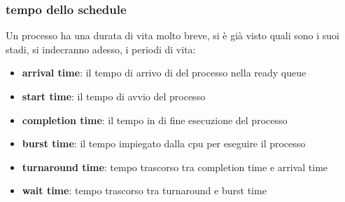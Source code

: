 \documentclass{article}
\begin{document}
        \subsubsection{tempo dello schedule}
            Un processo ha una durata di vita molto breve, si è già visto quali sono i suoi stadi, si indecranno adesso, i periodi di vita:
            \begin{itemize}
                \item \textbf{arrival time}:
                    il tempo di arrivo di del processo nella ready queue
                \item \textbf{start time}:
                    il tempo di avvio del processo
                \item \textbf{completion time}:
                    il tempo in di fine esecuzione del processo
                \item \textbf{burst time}:
                    il tempo impiegato dalla cpu per eseguire il processo
                \item \textbf{turnaround time}:
                    tempo trascorso tra completion time e arrival time
                \item \textbf{wait time}:
                    tempo trascorso tra turnaround e burst time
            \end{itemize}
\end{document}
